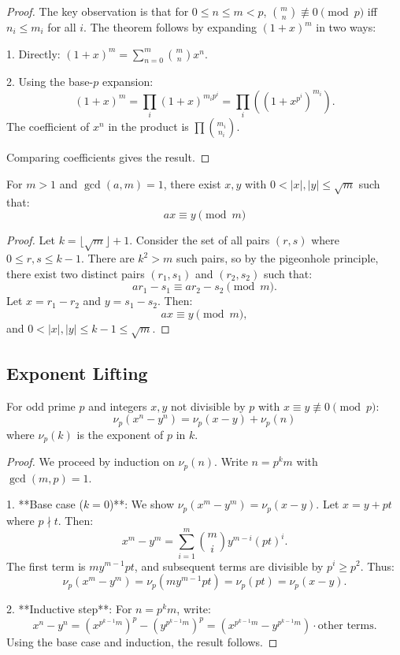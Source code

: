 \documentclass{scrartcl} %
\begin{document}
\begin{proof}
The key observation is that for $0 \leq n \leq m < p$, $\binom{m}{n} \not\equiv 0 \pmod{p}$ iff $n_i \leq m_i$ for all $i$. The theorem follows by expanding $(1 + x)^m$ in two ways:

1. Directly: $(1 + x)^m = \sum_{n=0}^m \binom{m}{n} x^n$.

2. Using the base-$p$ expansion:
\[
(1 + x)^m = \prod_{i} (1 + x)^{m_i p^i} = \prod_{i} \left((1 + x^{p^i})^{m_i}\right).
\]
The coefficient of $x^n$ in the product is $\prod \binom{m_i}{n_i}$.

Comparing coefficients gives the result.
\end{proof}

\begin{lemma}\label{lem:thueslemma}
For $m > 1$ and $\gcd(a,m) = 1$, there exist $x,y$ with $0 < |x|,|y| \leq \sqrt{m}$ such that:
\[ ax \equiv y \pmod{m} \]
\end{lemma}

\begin{proof}
Let $k = \lfloor \sqrt{m} \rfloor + 1$. Consider the set of all pairs $(r, s)$ where $0 \leq r, s \leq k-1$. There are $k^2 > m$ such pairs, so by the pigeonhole principle, there exist two distinct pairs $(r_1, s_1)$ and $(r_2, s_2)$ such that:
\[
a r_1 - s_1 \equiv a r_2 - s_2 \pmod{m}.
\]
Let $x = r_1 - r_2$ and $y = s_1 - s_2$. Then:
\[
a x \equiv y \pmod{m},
\]
and $0 < |x|, |y| \leq k-1 \leq \sqrt{m}$.
\end{proof}

\subsection{Exponent Lifting}

\begin{theorem}\label{thm:liftingtheexponent}
For odd prime $p$ and integers $x,y$ not divisible by $p$ with $x \equiv y \not\equiv 0 \pmod{p}$:
\[ \nu_p(x^n - y^n) = \nu_p(x - y) + \nu_p(n) \]
where $\nu_p(k)$ is the exponent of $p$ in $k$.
\end{theorem}

\begin{proof}
We proceed by induction on $\nu_p(n)$. Write $n = p^k m$ with $\gcd(m, p) = 1$.

1. **Base case ($k = 0$)**: We show $\nu_p(x^m - y^m) = \nu_p(x - y)$. Let $x = y + p t$ where $p \nmid t$. Then:
\[
x^m - y^m = \sum_{i=1}^m \binom{m}{i} y^{m-i} (p t)^i.
\]
The first term is $m y^{m-1} p t$, and subsequent terms are divisible by $p^{i} \geq p^2$. Thus:
\[
\nu_p(x^m - y^m) = \nu_p(m y^{m-1} p t) = \nu_p(p t) = \nu_p(x - y).
\]

2. **Inductive step**: For $n = p^k m$, write:
\[
x^n - y^n = (x^{p^{k-1} m})^p - (y^{p^{k-1} m})^p = (x^{p^{k-1} m} - y^{p^{k-1} m}) \cdot \text{other terms}.
\]
Using the base case and induction, the result follows.
\end{proof}
\end{document}
